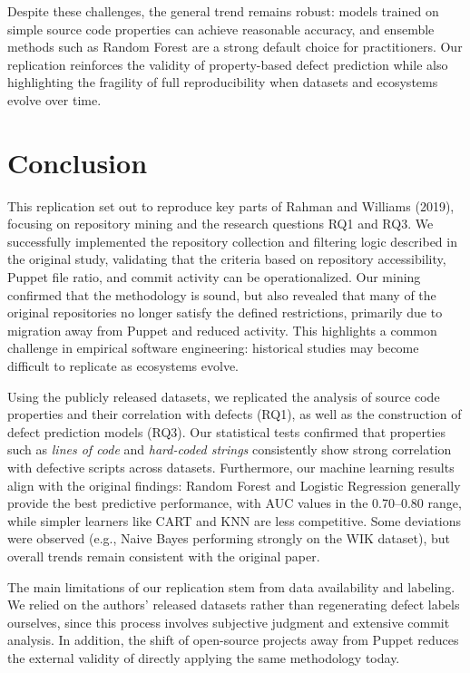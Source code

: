 \documentclass[conference]{IEEEtran}
\begin{document}
Despite these challenges, the general trend remains robust: models trained on simple source code properties can achieve reasonable accuracy, and ensemble methods such as Random Forest are a strong default choice for practitioners. 
Our replication reinforces the validity of property-based defect prediction while also highlighting the fragility of full reproducibility when datasets and ecosystems evolve over time.


	
	\section{Conclusion}
	This replication set out to reproduce key parts of Rahman and Williams (2019), focusing on repository mining and the research questions RQ1 and RQ3. 
	We successfully implemented the repository collection and filtering logic described in the original study, validating that the criteria based on repository accessibility, Puppet file ratio, and commit activity can be operationalized. 
	Our mining confirmed that the methodology is sound, but also revealed that many of the original repositories no longer satisfy the defined restrictions, primarily due to migration away from Puppet and reduced activity. 
	This highlights a common challenge in empirical software engineering: historical studies may become difficult to replicate as ecosystems evolve.
	
	Using the publicly released datasets, we replicated the analysis of source code properties and their correlation with defects (RQ1), as well as the construction of defect prediction models (RQ3). 
	Our statistical tests confirmed that properties such as \emph{lines of code} and \emph{hard-coded strings} consistently show strong correlation with defective scripts across datasets. 
	Furthermore, our machine learning results align with the original findings: Random Forest and Logistic Regression generally provide the best predictive performance, with AUC values in the 0.70–0.80 range, while simpler learners like CART and KNN are less competitive. 
	Some deviations were observed (e.g., Naive Bayes performing strongly on the WIK dataset), but overall trends remain consistent with the original paper.
	
	The main limitations of our replication stem from data availability and labeling. 
	We relied on the authors’ released datasets rather than regenerating defect labels ourselves, since this process involves subjective judgment and extensive commit analysis. 
	In addition, the shift of open-source projects away from Puppet reduces the external validity of directly applying the same methodology today.
	
\end{document}

